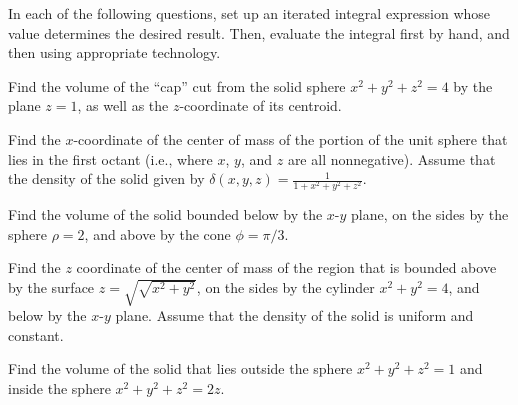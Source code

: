 \begin{exercises} 

\item In each of the following questions, set up an iterated integral expression whose value determines the desired result.  Then, evaluate the integral first by hand, and then using appropriate technology.
	\ba
	\item Find the volume of the ``cap'' cut from the solid sphere $x^2 + y^2 + z^2 = 4$ by the plane $z=1$, as well as the $z$-coordinate of its centroid.

	\item Find the $x$-coordinate of the center of mass of the portion of the unit sphere that lies in the first octant (i.e., where $x$, $y$, and $z$ are all nonnegative).  Assume that the density of the solid given by $\delta(x,y,z) = \frac{1}{1+x^2+y^2+z^2}$.

	\item Find the volume of the solid bounded below by the $x$-$y$ plane, on the sides by the sphere $\rho=2
$, and above by the cone $\phi = \pi/3$.


	\item Find the $z$ coordinate of the center of mass of the region that is bounded above by the surface $z = \sqrt{\sqrt{x^2 + y^2}}$, on the sides by the cylinder $x^2 + y^2 = 4$, and below by the $x$-$y$ plane.   Assume that the density of the solid is uniform and constant.

	\item Find the volume of the solid that lies outside the sphere $x^2 + y^2 + z^2 = 1$ and inside the sphere $x^2 + y^2 + z^2 = 2z$.

	\ea


\end{exercises}
